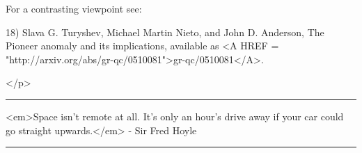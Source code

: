 For a contrasting viewpoint see:

18) Slava G. Turyshev, Michael Martin Nieto, and John D. Anderson,
The Pioneer anomaly and its implications, available as 
<A HREF = "http://arxiv.org/abs/gr-qc/0510081">gr-qc/0510081</A>.


</p>
\par\noindent\rule{\textwidth}{0.4pt}
<em>Space isn't remote at all. It's only an hour's drive away if your 
car could go straight upwards.</em> - Sir Fred Hoyle
\par\noindent\rule{\textwidth}{0.4pt}


